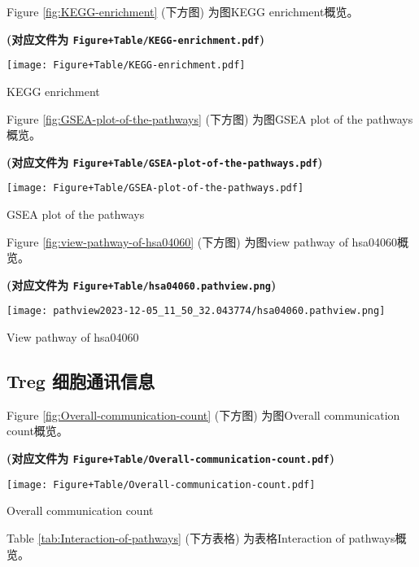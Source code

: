 \documentclass[
]{article}
\begin{document}
Figure \ref{fig:KEGG-enrichment} (下方图) 为图KEGG enrichment概览。

\textbf{(对应文件为 \texttt{Figure+Table/KEGG-enrichment.pdf})}

\def\@captype{figure}
\begin{center}
\texttt{[image: Figure+Table/KEGG-enrichment.pdf]}
\caption{KEGG enrichment}\label{fig:KEGG-enrichment}
\end{center}

Figure \ref{fig:GSEA-plot-of-the-pathways} (下方图) 为图GSEA plot of the pathways概览。

\textbf{(对应文件为 \texttt{Figure+Table/GSEA-plot-of-the-pathways.pdf})}

\def\@captype{figure}
\begin{center}
\texttt{[image: Figure+Table/GSEA-plot-of-the-pathways.pdf]}
\caption{GSEA plot of the pathways}\label{fig:GSEA-plot-of-the-pathways}
\end{center}

Figure \ref{fig:view-pathway-of-hsa04060} (下方图) 为图view pathway of hsa04060概览。

\textbf{(对应文件为 \texttt{Figure+Table/hsa04060.pathview.png})}

\def\@captype{figure}
\begin{center}
\texttt{[image: pathview2023-12-05\_11\_50\_32.043774/hsa04060.pathview.png]}
\caption{View pathway of hsa04060}\label{fig:view-pathway-of-hsa04060}
\end{center}

\hypertarget{treg-ux7ec6ux80deux901aux8bafux4fe1ux606f}{%
\subsection{Treg 细胞通讯信息}\label{treg-ux7ec6ux80deux901aux8bafux4fe1ux606f}}

Figure \ref{fig:Overall-communication-count} (下方图) 为图Overall communication count概览。

\textbf{(对应文件为 \texttt{Figure+Table/Overall-communication-count.pdf})}

\def\@captype{figure}
\begin{center}
\texttt{[image: Figure+Table/Overall-communication-count.pdf]}
\caption{Overall communication count}\label{fig:Overall-communication-count}
\end{center}

Table \ref{tab:Interaction-of-pathways} (下方表格) 为表格Interaction of pathways概览。
\end{document}
